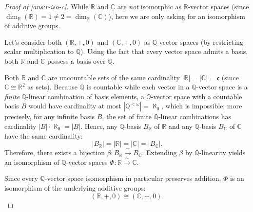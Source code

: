 \begin{content}


\begin{proof}[Proof of \cref{ans:r-iso-c}]
While $\mathbb{R}$ and $\mathbb{C}$ are \emph{not} isomorphic as $\mathbb{R}$-vector spaces (since $\dim_{\mathbb{R}}(\mathbb{R}) = 1 \neq 2 = \dim_{\mathbb{R}}(\mathbb{C})$), here we are only asking for an isomorphism of additive groups.

Let's consider both $(\mathbb{R}, +, 0)$ and $(\mathbb{C}, +, 0)$ as $\mathbb{Q}$-vector spaces (by restricting scalar multiplication to $\mathbb{Q}$). Using the fact that every vector space admits a basis, both $\mathbb{R}$ and $\mathbb{C}$ possess a basis over $\mathbb{Q}$.

Both $\mathbb{R}$ and $\mathbb{C}$ are uncountable sets of the same cardinality $|\mathbb{R}| = |\mathbb{C}| = \mathfrak{c}$ (since $\mathbb{C} \cong \mathbb{R}^2$ as sets). Because $\mathbb{Q}$ is countable while each vector in a $\mathbb{Q}$-vector space is a \emph{finite} $\mathbb{Q}$-linear combination of basis elements, a $\mathbb{Q}$-vector space with a countable basis $B$ would have cardinality at most $|\mathbb{Q}^{<\omega}| = \aleph_0$, which is impossible; more precisely, for any infinite basis $B$, the set of finite $\mathbb{Q}$-linear combinations has cardinality $|B| \cdot \aleph_0 = |B|$. Hence, any $\mathbb{Q}$-basis $B_{\mathbb{R}}$ of $\mathbb{R}$ and any $\mathbb{Q}$-basis $B_{\mathbb{C}}$ of $\mathbb{C}$ have the same cardinality:
\[
|B_{\mathbb{R}}| = |\mathbb{R}| = |\mathbb{C}| = |B_{\mathbb{C}}|.
\]
Therefore, there exists a bijection $\beta \colon B_{\mathbb{R}} \xrightarrow{\;\sim\;} B_{\mathbb{C}}$. Extending $\beta$ by $\mathbb{Q}$-linearity yields an isomorphism of $\mathbb{Q}$-vector spaces $\Phi \colon \mathbb{R} \xrightarrow{\;\sim\;} \mathbb{C}$.

Since every $\mathbb{Q}$-vector space isomorphism in particular preserves addition, $\Phi$ is an isomorphism of the underlying additive groups:
\[
(\mathbb{R}, +, 0) \cong (\mathbb{C}, +, 0).
\]
\end{proof}


\end{content}
